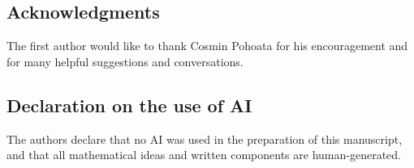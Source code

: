 \documentclass[A4paper,reqno,oneside,12pt]{amsart}
\theoremstyle{plain}
\theoremstyle{definition}
\begin{document}
\subsection{Acknowledgments}
The first author would like to thank Cosmin Pohoata for his encouragement and for many helpful suggestions and conversations.

\subsection{Declaration on the use of AI}
The authors declare that no AI was used in the preparation of this manuscript, and that all mathematical ideas and written components are human-generated.

\end{document}
